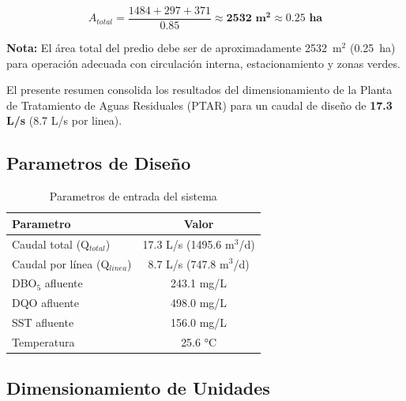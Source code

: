 \documentclass[12pt,a4paper]{article}
\begin{document}
\begin{equation}
A_{total} = \frac{1484 + 297 + 371}{0.85} \approx \mathbf{2532 \text{ m}^2} \approx \mathbf{0.25 \text{ ha}}
\end{equation}

\textbf{Nota:} El área total del predio debe ser de aproximadamente 2532~m$^2$ (0.25~ha) para operación adecuada con circulación interna, estacionamiento y zonas verdes.

\newpage



El presente resumen consolida los resultados del dimensionamiento de la Planta de Tratamiento de Aguas Residuales (PTAR) para un caudal de dise\~no de \textbf{17.3 L/s} (8.7 L/s por linea).

\subsection{Parametros de Dise\~no}

\begin{table}[H]
\centering
\caption{Parametros de entrada del sistema}
\begin{tabular}{lc}
\toprule
\textbf{Parametro} & \textbf{Valor} \\
\midrule
Caudal total (Q$_{total}$) & 17.3 L/s (1495.6 m$^3$/d) \\
Caudal por línea (Q$_{linea}$) & 8.7 L/s (747.8 m$^3$/d) \\
DBO$_5$ afluente & 243.1 mg/L \\
DQO afluente & 498.0 mg/L \\
SST afluente & 156.0 mg/L \\
Temperatura & 25.6 °C \\
\bottomrule
\end{tabular}
\end{table}

\subsection{Dimensionamiento de Unidades}
\end{document}
